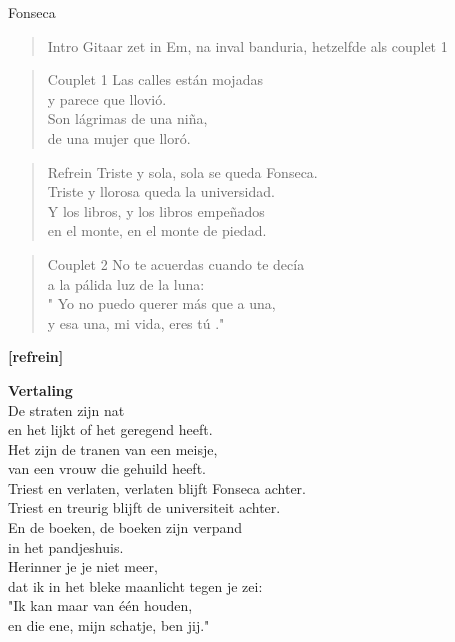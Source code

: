 \begin{song}{Fonseca}

\begin{verse}{Intro}
Gitaar zet in Em, na inval banduria, hetzelfde als couplet 1
\end{verse}
\begin{verse}{Couplet 1}
Las calles están mojadas\\
y parece que llovió.\\
Son lágrimas de una niña,\\
de una mujer que lloró.\\
\end{verse}

\begin{verse}{Refrein}
Triste y sola, sola se queda Fonseca.\\
Triste y llorosa queda la universidad.\\
Y los libros, y los libros empeñados\\
en el monte, en el monte de piedad.\\
\end{verse}

\begin{verse}{Couplet 2}
No te acuerdas cuando te decía\\
a la pálida luz de la luna:\\
\chord{}" Yo no puedo querer más que a una,\\
y esa una, mi vida, eres tú ."\\
\end{verse}

\textbf{[refrein]}\\
\end{song}
\textbf{Vertaling}\\
De straten zijn nat\\
en het lijkt of het geregend heeft.\\
Het zijn de tranen van een meisje,\\
van een vrouw die gehuild heeft.\\\vspace{1em}
Triest en verlaten, verlaten blijft Fonseca achter.\\
Triest en treurig blijft de universiteit achter.\\
En de boeken, de boeken zijn verpand\\
in het pandjeshuis.\\\vspace{1em}
Herinner je je niet meer,\\
dat ik in het bleke maanlicht tegen je zei:\\
"\hspace{0.1em}Ik kan maar van één houden,\\
en die ene, mijn schatje, ben jij."\\
